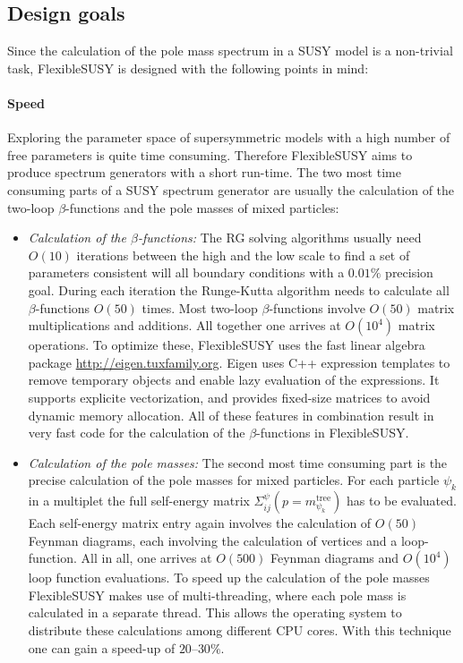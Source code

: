 \documentclass[final,3p,11pt,pdflatex]{elsarticle}
\makeatletter
\newcommand{\fs}{FlexibleSUSY\@\xspace}
\makeatother
\begin{document}
\subsection*{Design goals}

Since the calculation of the pole mass spectrum in a SUSY model is a
non-trivial task, \fs is designed with the following points in mind:

\paragraph{Speed}

Exploring the parameter space of supersymmetric models with a high
number of free parameters is quite time consuming.  Therefore \fs aims
to produce spectrum generators with a short run-time.  The two most
time consuming parts of a SUSY spectrum generator are usually the
calculation of the two-loop $\beta$-functions and the pole masses of
mixed particles:
%
\begin{itemize}
\item \emph{Calculation of the $\beta$-functions:} The RG solving
  algorithms usually need $O(10)$ iterations between the high and the
  low scale to find a set of parameters consistent will all boundary
  conditions with a $0.01\%$ precision goal.  During each iteration
  the Runge-Kutta algorithm needs to calculate all $\beta$-functions
  $O(50)$ times.  Most two-loop $\beta$-functions involve $O(50)$
  matrix multiplications and additions.  All together one arrives at
  $O(10^4)$ matrix operations.  To optimize these, \fs uses the fast
  linear algebra package \href{Eigen}{http://eigen.tuxfamily.org}.
  Eigen uses C++ expression templates to remove temporary objects and
  enable lazy evaluation of the expressions.  It supports explicite
  vectorization, and provides fixed-size matrices to avoid dynamic
  memory allocation.  All of these features in combination result in
  very fast code for the calculation of the $\beta$-functions in \fs.
%
\item \emph{Calculation of the pole masses:} The second most time
  consuming part is the precise calculation of the pole masses for
  mixed particles.  For each particle $\psi_k$ in a multiplet the full
  self-energy matrix $\Sigma^\psi_{ij}(p=m^\text{tree}_{\psi_k})$ has
  to be evaluated.  Each self-energy matrix entry again involves the
  calculation of $O(50)$ Feynman diagrams, each involving the
  calculation of vertices and a loop-function.  All in all, one
  arrives at $O(500)$ Feynman diagrams and $O(10^4)$ loop function
  evaluations.  To speed up the calculation of the pole masses \fs
  makes use of multi-threading, where each pole mass is calculated in
  a separate thread.  This allows the operating system to distribute
  these calculations among different CPU cores.  With this technique
  one can gain a speed-up of $20$--$30\%$.
\end{itemize}
\end{document}
